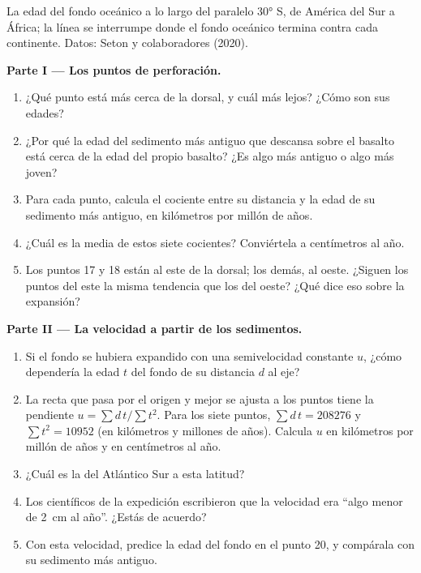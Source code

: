 \begin{problem}
\begin{center}
{\small La edad del fondo oceánico a lo largo del paralelo \ang{30} S, de
América del Sur a África; la línea se interrumpe donde el fondo oceánico
termina contra cada continente. Datos: Seton y colaboradores (2020).}
\end{center}

\medskip
\noindent\textbf{Parte I --- Los puntos de perforación.}
\begin{enumerate}
  \item ¿Qué punto está más cerca de la dorsal, y cuál más lejos? ¿Cómo son
        sus edades?
  \item ¿Por qué la edad del sedimento más antiguo que descansa sobre el
        basalto está cerca de la edad del propio basalto? ¿Es algo más
        antiguo o algo más joven?
  \item Para cada punto, calcula el cociente entre su distancia y la edad de
        su sedimento más antiguo, en kilómetros por millón de años.
  \item ¿Cuál es la media de estos siete cocientes? Conviértela a
        centímetros al año.
  \item Los puntos 17 y 18 están al este de la dorsal; los demás, al oeste.
        ¿Siguen los puntos del este la misma tendencia que los del oeste?
        ¿Qué dice eso sobre la expansión?
\end{enumerate}

\medskip
\noindent\textbf{Parte II --- La velocidad a partir de los sedimentos.}
\begin{enumerate}[resume]
  \item Si el fondo se hubiera expandido con una semivelocidad constante
        $u$, ¿cómo dependería la edad $t$ del fondo de su distancia $d$ al
        eje?
  \item La recta que pasa por el origen y mejor se ajusta a los puntos tiene
        la pendiente $u = \sum d\,t / \sum t^2$. Para los siete puntos,
        $\sum d\,t = \num{208276}$ y $\sum t^2 = \num{10952}$ (en
        kilómetros y millones de años). Calcula $u$ en kilómetros por
        millón de años y en centímetros al año.
  \item ¿Cuál es la  del Atlántico Sur a esta
        latitud?
  \item Los científicos de la expedición escribieron que la velocidad era
        ``algo menor de \qty{2}{cm} al año''. ¿Estás de acuerdo?
  \item Con esta velocidad, predice la edad del fondo en el punto 20, y
        compárala con su sedimento más antiguo.
\end{enumerate}


\end{problem}
